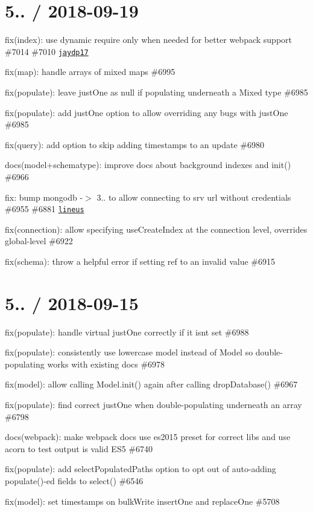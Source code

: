 \section*{5.. / 2018-\/09-\/19 }


\begin{DoxyItemize}
\item fix(index)\+: use dynamic require only when needed for better webpack support \#7014 \#7010 \href{https://github.com/jaydp17}{\tt jaydp17}
\item fix(map)\+: handle arrays of mixed maps \#6995
\item fix(populate)\+: leave just\+One as null if populating underneath a Mixed type \#6985
\item fix(populate)\+: add just\+One option to allow overriding any bugs with just\+One \#6985
\item fix(query)\+: add option to skip adding timestamps to an update \#6980
\item docs(model+schematype)\+: improve docs about background indexes and init() \#6966
\item fix\+: bump mongodb -\/$>$ 3.. to allow connecting to srv url without credentials \#6955 \#6881 \href{https://github.com/lineus}{\tt lineus}
\item fix(connection)\+: allow specifying {\ttfamily use\+Create\+Index} at the connection level, overrides global-\/level \#6922
\item fix(schema)\+: throw a helpful error if setting {\ttfamily ref} to an invalid value \#6915
\end{DoxyItemize}

\section*{5.. / 2018-\/09-\/15 }


\begin{DoxyItemize}
\item fix(populate)\+: handle virtual just\+One correctly if it isn\textquotesingle{}t set \#6988
\item fix(populate)\+: consistently use lowercase {\ttfamily model} instead of {\ttfamily Model} so double-\/populating works with existing docs \#6978
\item fix(model)\+: allow calling {\ttfamily Model.\+init()} again after calling {\ttfamily drop\+Database()} \#6967
\item fix(populate)\+: find correct just\+One when double-\/populating underneath an array \#6798
\item docs(webpack)\+: make webpack docs use es2015 preset for correct libs and use acorn to test output is valid E\+S5 \#6740
\item fix(populate)\+: add select\+Populated\+Paths option to opt out of auto-\/adding {\ttfamily populate()}-\/ed fields to {\ttfamily select()} \#6546
\item fix(model)\+: set timestamps on bulk\+Write {\ttfamily insert\+One} and {\ttfamily replace\+One} \#5708
\end{DoxyItemize}

